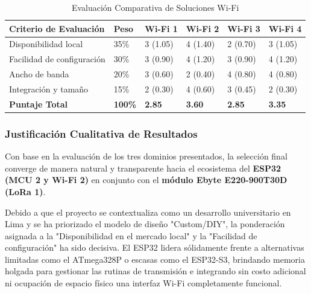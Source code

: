 \begin{table}[H]
    \centering
    \renewcommand{\arraystretch}{1.5}
    \caption{Evaluación Comparativa de Soluciones Wi-Fi}
    \label{tabla:evaluacion_wifi}
    \begin{tabular}{|p{4.5cm}|p{1.5cm}|p{1.5cm}|p{1.5cm}|p{1.5cm}|p{1.5cm}|}
        \hline
        \textbf{Criterio de Evaluación} & \textbf{Peso}  & \textbf{Wi-Fi 1} & \textbf{Wi-Fi 2} & \textbf{Wi-Fi 3} & \textbf{Wi-Fi 4} \\ \hline
        Disponibilidad local            & 35\%           & 3 (1.05)         & 4 (1.40)         & 2 (0.70)         & 3 (1.05)         \\ \hline
        Facilidad de configuración      & 30\%           & 3 (0.90)         & 4 (1.20)         & 3 (0.90)         & 4 (1.20)         \\ \hline
        Ancho de banda                  & 20\%           & 3 (0.60)         & 2 (0.40)         & 4 (0.80)         & 4 (0.80)         \\ \hline
        Integración y tamaño            & 15\%           & 2 (0.30)         & 4 (0.60)         & 3 (0.45)         & 2 (0.30)         \\ \hline
        \textbf{Puntaje Total}          & \textbf{100\%} & \textbf{2.85}    & \textbf{3.60}    & \textbf{2.85}    & \textbf{3.35}    \\ \hline
    \end{tabular}
\end{table}

\subsubsection{Justificación Cualitativa de Resultados}

Con base en la evaluación de los tres dominios presentados, la selección final converge de manera natural y transparente hacia el ecosistema del \textbf{ESP32 (MCU 2 y Wi-Fi 2)} en conjunto con el \textbf{módulo Ebyte E220-900T30D (LoRa 1)}.

Debido a que el proyecto se contextualiza como un desarrollo universitario en Lima y se ha priorizado el modelo de diseño "Custom/DIY", la ponderación asignada a la "Disponibilidad en el mercado local" y la "Facilidad de configuración" ha sido decisiva. El ESP32 lidera sólidamente frente a alternativas limitadas como el ATmega328P o escasas como el ESP32-S3, brindando memoria holgada para gestionar las rutinas de transmisión e integrando sin costo adicional ni ocupación de espacio físico una interfaz Wi-Fi completamente funcional.

